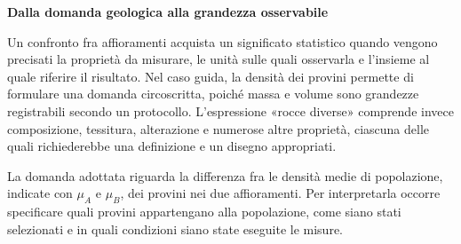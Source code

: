 \documentclass[12pt,aspectratio=1610]{beamer}
\begin{document}
\begin{frame}[plain]
\end{frame}
\begin{lrbox}{\TitleBox}\begin{minipage}[t]{18.2cm}\raggedright\sloppy\color{Ink}\fontsize{20.7}{24}\selectfont \bfseries\color{Navy}Dalla domanda geologica alla grandezza osservabile\end{minipage}\end{lrbox}
\begin{lrbox}{\BodyBox}\begin{minipage}[t]{10.25cm}\raggedright\sloppy\color{Ink}\fontsize{12.4}{16.4}\selectfont Un confronto fra affioramenti acquista un significato statistico quando vengono precisati la proprietà da misurare, le unità sulle quali osservarla e l’insieme al quale riferire il risultato. Nel caso guida, la densità dei provini permette di formulare una domanda circoscritta, poiché massa e volume sono grandezze registrabili secondo un protocollo. L’espressione «rocce diverse» comprende invece composizione, tessitura, alterazione e numerose altre proprietà, ciascuna delle quali richiederebbe una definizione e un disegno appropriati.\end{minipage}\end{lrbox}
\begin{lrbox}{\SideBox}\begin{minipage}[t]{7.45cm}\raggedright\sloppy\color{Ink}\fontsize{12.2}{16.1}\selectfont La domanda adottata riguarda la differenza fra le densità medie di popolazione, indicate con $\mu_A$ e $\mu_B$, dei provini nei due affioramenti. Per interpretarla occorre specificare quali provini appartengano alla popolazione, come siano stati selezionati e in quali condizioni siano state eseguite le misure.\par{}\end{minipage}\end{lrbox}
\end{document}
